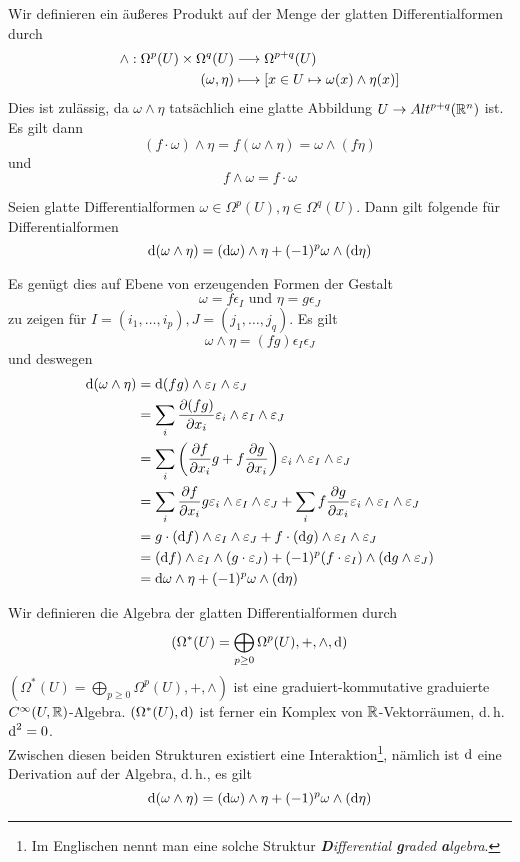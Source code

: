 \Def{}
Wir definieren ein äußeres Produkt auf der Menge der glatten Differentialformen durch
\begin{align*}
 \wedge : \Omega^p(U) \times \Omega^q(U) & \overset{{}}{\longrightarrow} \Omega^{p+q}(U)\\
 (\omega,\eta) & \longmapsto [x \in U \mapsto \omega(x)\wedge \eta(x)] 
\end{align*}
Dies ist zulässig, da $\omega\wedge \eta$ tatsächlich eine glatte Abbildung $U \overset{}{\rightarrow} Alt^{p+q}(\mathbb{R}^n)$ ist.\\
Es gilt dann
\[ (f\cdot \omega)\wedge \eta = f(\omega \wedge \eta) = \omega \wedge (f\eta) \]
und
\[ f\wedge \omega = f \cdot\omega\]

\Lem{}
Seien glatte Differentialformen $\omega\in \Omega^p(U), \eta \in \Omega^q(U)$. Dann gilt folgende  für Differentialformen
\[ \text{d}(\omega \wedge \eta) = (\text{d} \omega) \wedge \eta +  (-1)^{p} \omega \wedge (\text{d} \eta) \]
\begin{Beweis}{}
Es genügt dies auf Ebene von erzeugenden Formen der Gestalt
\[ \omega = f\epsilon_I \text{ und } \eta = g\epsilon_J \]
zu zeigen für $I = (i_1,\ldots, i_p), J = (j_1, \ldots, j_q)$. Es gilt
\[ \omega \wedge \eta = (fg)\epsilon_I \epsilon_J \]
und deswegen
\begin{align*}
\text{d} (\omega \wedge \eta) &= \text{d} (fg) \wedge \varepsilon_I \wedge \varepsilon_J\\
&= \sum_{i} \frac{\partial (fg)}{\partial x_i} \varepsilon_i \wedge \varepsilon_I \wedge \varepsilon_J\\
&= \sum_{i} \left(\frac{\partial f}{\partial x_i} g + f \frac{\partial g}{\partial x_i}\right) \varepsilon_i \wedge \varepsilon_I \wedge \varepsilon_J\\
&= \sum_{i} \frac{\partial f}{\partial x_i} g  \varepsilon_i \wedge \varepsilon_I \wedge \varepsilon_J
+ \sum_{i} f\frac{\partial g}{\partial x_i}  \varepsilon_i \wedge \varepsilon_I \wedge \varepsilon_J\\
&=g \cdot (\text{d} f) \wedge \varepsilon_I \wedge \varepsilon_J +  f \cdot (\text{d} g) \wedge \varepsilon_I \wedge \varepsilon_J\\
&=(\text{d} f) \wedge \varepsilon_I \wedge (g \cdot \varepsilon_J) +  (-1)^p(f \cdot \varepsilon_I) \wedge (\text{d} g \wedge\varepsilon_J)\\
&= \text{d} \omega  \wedge \eta + (-1)^p\omega \wedge (\text{d} \eta)
\end{align*}
\end{Beweis}

\Def{}
Wir definieren die Algebra der glatten Differentialformen durch
\[ (\Omega^*(U) = \bigoplus_{p\geq 0} \Omega^p(U), +, \wedge, \text{d}) \]
$(\Omega^*(U) = \bigoplus_{p\geq 0} \Omega^p(U), +, \wedge)$ ist eine graduiert-kommutative graduierte $C^\infty(U,\mathbb{R})$-Algebra. $(\Omega^*(U),\text{d})$ ist ferner ein Komplex von $\mathbb{R}$-Vektorräumen, d.\,h. $\text{d}^2 = 0$.\\
Zwischen diesen beiden Strukturen existiert eine Interaktion\footnote{Im Englischen nennt man eine solche Struktur\textsl{ \textbf{D}ifferential \textbf{g}raded \textbf{a}lgebra}.}, nämlich ist $\text{d}$ eine Derivation auf der Algebra, d.\,h., es gilt
\[ \text{d}(\omega\wedge \eta) = (\text{d} \omega) \wedge \eta + (-1)^p \omega \wedge (\text{d} \eta) \]


